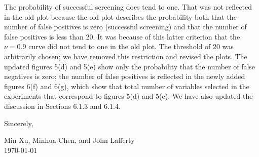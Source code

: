 \documentclass[pdftex,12pt]{article}
\begin{document}
\begin{enumerate}
The probability of successful screening does tend to one. That was not
reflected in the old plot because the old plot describes the
probability both that the number of false positives is zero (successful
screening) and that the number of false positives is less than 20. It
was because of this latter criterion that the $\nu =0.9$ curve did not
tend to one in the old plot. The threshold of 20 was arbitrarily
chosen; we have removed this restriction and revised the plots. The updated figures
5(d) and 5(e) show only the probability that the number of false
negatives is zero; the number of false positives is reflected in the
newly added figures 6(f) and 6(g), which show that total number of
variables selected in the experiments that correspond to figures 5(d)
and 5(e). We have also updated the discussion in Sections 6.1.3 and
6.1.4.

\end{enumerate}




\vspace*{10pt}

Sincerely, 


Min Xu, Minhua Chen, and John Lafferty\\[1pt]
\today{}


\end{document}
